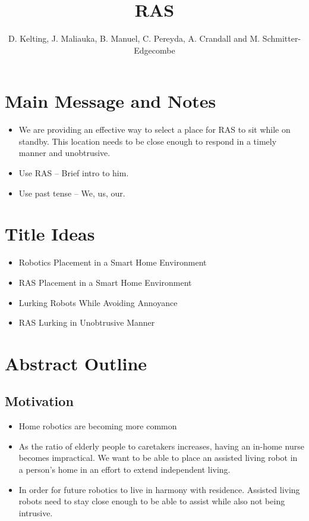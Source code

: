 \documentclass[11pt, conference, a4paper]{IEEEtran}
\author{D. Kelting, J. Maliauka, B. Manuel, C. Pereyda, A. Crandall and M. Schmitter-Edgecombe}
\title{RAS}
\begin{document}
\maketitle


\section{Main Message and Notes}
\begin{itemize}
	\item We are providing an effective way to select a place for RAS to sit while on standby. This location needs to be close enough to respond in a timely manner and unobtrusive.
	\item Use RAS -- Brief intro to him.
	\item Use past tense -- We, us, our.
\end{itemize}


\section{Title Ideas}
\begin{itemize}
	\item Robotics Placement in a Smart Home Environment
	\item RAS Placement in a Smart Home Environment 
	\item Lurking Robots While Avoiding Annoyance
	\item RAS Lurking in Unobtrusive Manner
	
\end{itemize}


\section{Abstract Outline}


\subsection{Motivation}
\begin{itemize}
    \item Home robotics are becoming more common
    \item As the ratio of elderly people to caretakers increases, having an 
        in-home nurse becomes impractical. We want to be able to place an assisted living robot 
        in a person's home in an effort to extend independent living.
    \item In order for future robotics to live in harmony with residence. Assisted living robots need 		to stay close enough to be able to assist while also not being intrusive. 
\end{itemize}
\end{document}
